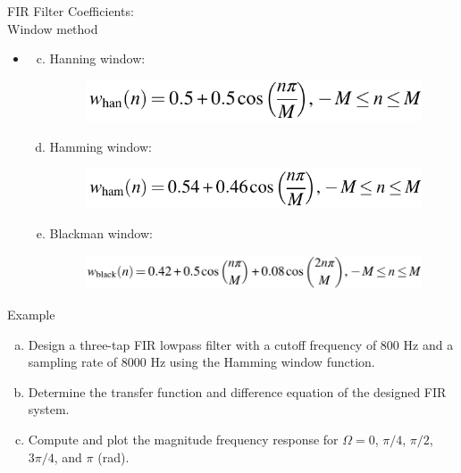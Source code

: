 \documentclass[pdflatex,compress,mathserif]{beamer}
\begin{document}
\begin{frame}{FIR Filter Coefficients:\\Window method}
    \begin{itemize}
        \item[]
        \begin{enumerate}[a.]
            \setcounter{enumi}{2}
            \item Hanning window:
            \begin{figure}
                \centering
                \includegraphics[width=0.7\linewidth]{./img/img20.png}
            \end{figure}
            \item Hamming window:
            \begin{figure}
                \centering
                \includegraphics[width=0.7\linewidth]{./img/img21.png}
            \end{figure}
            \item Blackman window:
            \begin{figure}
                \centering
                \includegraphics[width=0.9\linewidth]{./img/img22.png}
            \end{figure}
        \end{enumerate}
    \end{itemize}
\end{frame}

\begin{frame}{Example}
    \begin{enumerate}[a.]
        \item Design a three-tap FIR lowpass filter with a cutoff frequency of 800 Hz and a sampling rate of 8000 Hz using the Hamming window function.
        \item Determine the transfer function and difference equation of the designed FIR system.
        \item Compute and plot the magnitude frequency response for $\Omega = 0$, $\pi/4$, $\pi/2$, $3\pi/4$, and $\pi$ (rad).
    \end{enumerate}
\end{frame}
\end{document}
